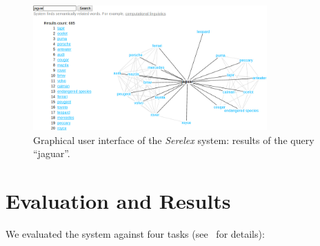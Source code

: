 \documentclass[runningheads,a4paper]{llncs}
\begin{document}
\begin{figure}
	\centering
		\includegraphics[width=0.80\textwidth]{figures/jaguar} 
		\caption{Graphical user interface of the \textit{Serelex} system: results of the query ``jaguar''.}
			\label{fig:gui}
\end{figure}

\section{Evaluation and Results}

We evaluated the system against four tasks (see~\cite{panchenko2012konvens} for details): 

\end{document}
